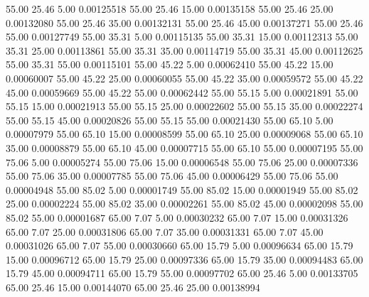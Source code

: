      55.00     25.46      5.00     0.00125518
     55.00     25.46     15.00     0.00135158
     55.00     25.46     25.00     0.00132080
     55.00     25.46     35.00     0.00132131
     55.00     25.46     45.00     0.00137271
     55.00     25.46     55.00     0.00127749
     55.00     35.31      5.00     0.00115135
     55.00     35.31     15.00     0.00112313
     55.00     35.31     25.00     0.00113861
     55.00     35.31     35.00     0.00114719
     55.00     35.31     45.00     0.00112625
     55.00     35.31     55.00     0.00115101
     55.00     45.22      5.00     0.00062410
     55.00     45.22     15.00     0.00060007
     55.00     45.22     25.00     0.00060055
     55.00     45.22     35.00     0.00059572
     55.00     45.22     45.00     0.00059669
     55.00     45.22     55.00     0.00062442
     55.00     55.15      5.00     0.00021891
     55.00     55.15     15.00     0.00021913
     55.00     55.15     25.00     0.00022602
     55.00     55.15     35.00     0.00022274
     55.00     55.15     45.00     0.00020826
     55.00     55.15     55.00     0.00021430
     55.00     65.10      5.00     0.00007979
     55.00     65.10     15.00     0.00008599
     55.00     65.10     25.00     0.00009068
     55.00     65.10     35.00     0.00008879
     55.00     65.10     45.00     0.00007715
     55.00     65.10     55.00     0.00007195
     55.00     75.06      5.00     0.00005274
     55.00     75.06     15.00     0.00006548
     55.00     75.06     25.00     0.00007336
     55.00     75.06     35.00     0.00007785
     55.00     75.06     45.00     0.00006429
     55.00     75.06     55.00     0.00004948
     55.00     85.02      5.00     0.00001749
     55.00     85.02     15.00     0.00001949
     55.00     85.02     25.00     0.00002224
     55.00     85.02     35.00     0.00002261
     55.00     85.02     45.00     0.00002098
     55.00     85.02     55.00     0.00001687
     65.00      7.07      5.00     0.00030232
     65.00      7.07     15.00     0.00031326
     65.00      7.07     25.00     0.00031806
     65.00      7.07     35.00     0.00031331
     65.00      7.07     45.00     0.00031026
     65.00      7.07     55.00     0.00030660
     65.00     15.79      5.00     0.00096634
     65.00     15.79     15.00     0.00096712
     65.00     15.79     25.00     0.00097336
     65.00     15.79     35.00     0.00094483
     65.00     15.79     45.00     0.00094711
     65.00     15.79     55.00     0.00097702
     65.00     25.46      5.00     0.00133705
     65.00     25.46     15.00     0.00144070
     65.00     25.46     25.00     0.00138994
